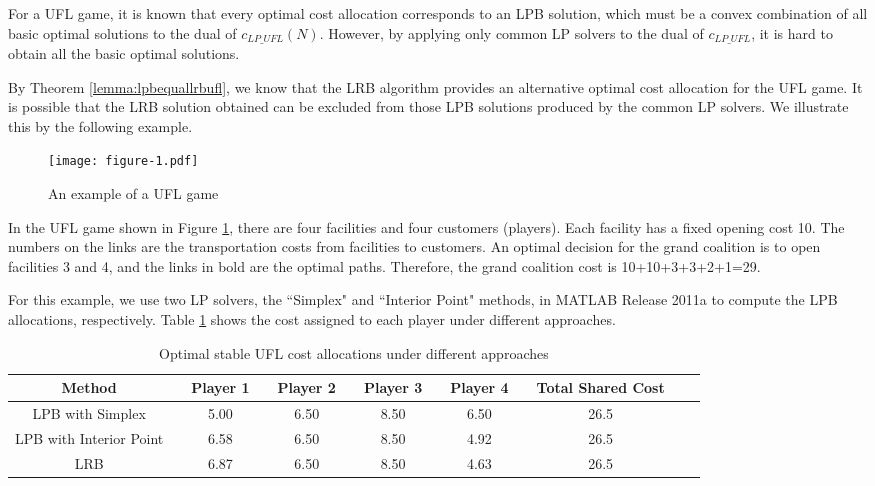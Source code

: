 For a UFL game, it is known that every optimal cost allocation corresponds to an LPB solution, which must be a convex combination of all basic optimal solutions to the dual of $c_{LP\_UFL}(N)$. However, by applying only common LP solvers to the dual of $c_{LP\_UFL}$, it is hard to obtain all the basic optimal solutions.

By Theorem \ref{lemma:lpbequallrbufl}, we know that the LRB algorithm provides an alternative optimal cost allocation for the UFL game. It is possible that the LRB solution obtained can be excluded from those LPB solutions produced by the common LP solvers. We illustrate this by the following example.

\begin{figure}[H]
\centering
\vspace{-0.1em}
\texttt{[image: figure-1.pdf]}
\caption{\label{figure:exampleUFL}An example of a UFL game}
\vspace{-3mm}
\end{figure}

In the UFL game shown in Figure \ref{figure:exampleUFL}, there are four facilities and four customers (players). Each facility has a fixed opening cost 10. The numbers on the links are the transportation costs from facilities to customers. An optimal decision for the grand coalition is to open facilities 3 and 4, and the links in bold are the optimal paths. Therefore, the grand coalition cost is 10+10+3+3+2+1=29.

For this example, we use two LP solvers, the ``Simplex" and ``Interior Point" methods, in MATLAB Release 2011a to compute the LPB allocations, respectively.
Table \ref{table:UFLCA} shows the cost assigned to each player under different approaches.

\begin{table}[H]
\vspace{-2mm}
\centering
\tabcolsep=4pt
\small
\renewcommand\arraystretch{1.5}
\caption{\label{table:UFLCA} Optimal stable UFL cost allocations under different approaches}
\begin{tabular}[!h]{c c c c c c c c c c c c c}
\hline
\multicolumn{1}{c}{Method} &\multicolumn{1}{c}{} &\multicolumn{1}{c}{Player 1} &\multicolumn{1}{c}{} &\multicolumn{1}{c}{Player 2} &\multicolumn{1}{c}{} &\multicolumn{1}{c}{Player 3} &\multicolumn{1}{c}{} &\multicolumn{1}{c}{Player 4}	&\multicolumn{1}{c}{} &\multicolumn{1}{c}{Total Shared Cost}\\
\hline
LPB with Simplex	& &5.00	& &6.50	& &8.50	& &6.50	&	&26.5	&\\
LPB with Interior Point	& &6.58	& &6.50	& &8.50	& &4.92	&	&26.5	&\\
LRB	& &6.87	& &6.50	& &8.50	& &4.63	&	&26.5	&\\
\hline
\end{tabular}
\vspace{-3mm}
\end{table}


